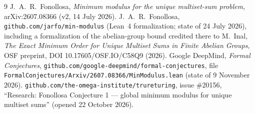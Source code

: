 \documentclass[11pt]{article}
\theoremstyle{definition}
\begin{document}
\begin{thebibliography}{9}
 J.~A.~R.~Fonollosa, \emph{Minimum modulus for the unique multiset-sum problem}, arXiv:2607.08366 (v2, 14 July 2026).
 J.~A.~R.~Fonollosa, \texttt{github.com/jarfo/min-modulus} (Lean~4 formalization; state of 24 July 2026), including a formalization of the abelian-group bound credited there to M.~Inal, \emph{The Exact Minimum Order for Unique Multiset Sums in Finite Abelian Groups}, OSF preprint, DOI 10.17605/OSF.IO/C58Q9 (2026).
 Google DeepMind, \emph{Formal Conjectures}, \texttt{github.com/google-deepmind/formal-conjectures}, file \texttt{FormalConjectures/Arxiv/2607.08366/MinModulus.lean} (state of 9 November 2026).
 \texttt{github.com/the-omega-institute/trureturing}, issue \#20156, ``Research: Fonollosa Conjecture 1 --- global minimum modulus for unique multiset sums'' (opened 22 October 2026).
\end{thebibliography}
\end{document}
